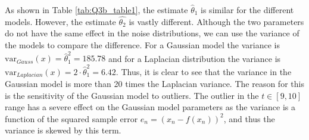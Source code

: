 \documentclass{article}
\begin{document}
As shown in Table \ref{tab:Q3b_table1}, the estimate $\hat{\theta}_1$ is similar for the different models. However, the estimate $\hat{\theta_2}$ is vastly different. Although the two parameters do not have the same effect in the noise distributions, we can use the variance of the models to compare the difference. For a Gaussian model the variance is $\text{var}_{Gauss}(x) = \hat{\theta}^2_1 = 185.78$ and for a Laplacian distribution the variance is $\text{var}_{Laplacian}(x) = 2\cdot\hat{\theta}_1^2 = 6.42$. Thus, it is clear to see that the variance in the Gaussian model is more than 20 times the Laplacian variance. The reason for this is the sensitivity of the Gaussian model to outliers. The outlier in the $t \in [9, 10]$ range has a severe effect on the Gaussian model parameters as the variance is a function of the squared sample error $e_n = (x_n - f(x_n))^2$, and thus the variance is skewed by this term.
\end{document}
